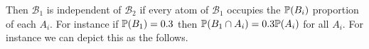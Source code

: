 \begin{summary}
\begin{center}
\begin{tikzpicture}[x=0.75pt,y=0.75pt,yscale=-1,xscale=1]
		\end{tikzpicture}
	\end{center}
	\FloatBarrier
	
	Then $ \mathcal{B}_1 $ is independent of $ \mathcal{B}_2 $ if every atom of $ \mathcal{B}_1 $ occupies the $ \prob(B_i) $ proportion of each $ A_i $. For instance if $ \prob(B_1) = 0.3 $ then $ \prob(B_1\cap A_i) = 0.3 \prob(A_i)$ for all $ A_i $. For instance we can depict this as the follows.
	
	\begin{center}
		
		\begin{tikzpicture}[x=0.75pt,y=0.75pt,yscale=-1,xscale=1]
			

\end{tikzpicture}
\end{center}
\end{summary}
